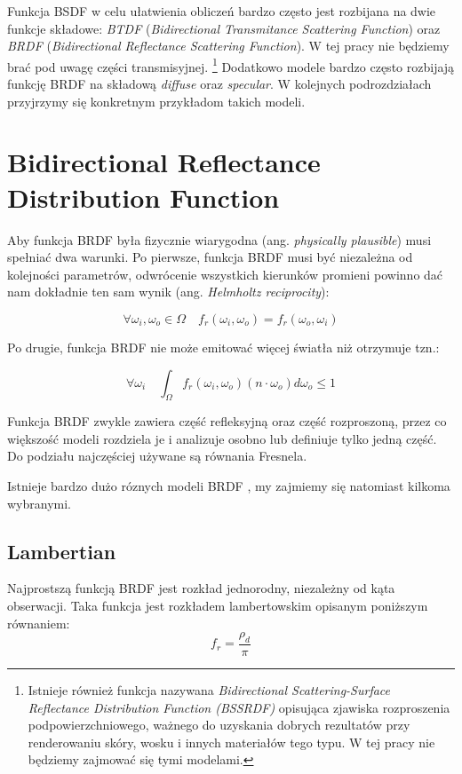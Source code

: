 \documentclass[../main.tex]{subfiles}
\begin{document}
Funkcja BSDF w celu ułatwienia obliczeń bardzo często jest rozbijana na dwie
funkcje składowe: \textit{BTDF} (\textit{Bidirectional Transmitance Scattering
Function}) oraz \textit{BRDF} (\textit{Bidirectional Reflectance Scattering
Function}). W tej pracy nie będziemy brać pod uwagę części transmisyjnej.
\footnote{
  Istnieje również funkcja nazywana \textit{Bidirectional Scattering-Surface
  Reflectance Distribution Function (BSSRDF)} opisująca zjawiska rozproszenia
  podpowierzchniowego, ważnego do uzyskania dobrych rezultatów przy
  renderowaniu skóry, wosku i innych materiałów tego typu. W tej pracy nie
  będziemy zajmować się tymi modelami.
}
Dodatkowo modele bardzo często rozbijają funkcję BRDF na składową
\textit{diffuse} oraz \textit{specular}.  W kolejnych podrozdziałach
przyjrzymy się konkretnym przykładom takich modeli.


\section{Bidirectional Reflectance Distribution Function}

Aby funkcja BRDF była fizycznie wiarygodna (ang. \textit{physically plausible})
musi spełniać dwa warunki. Po pierwsze, funkcja BRDF musi być niezależna od
kolejności parametrów, odwrócenie wszystkich kierunków promieni powinno dać nam
dokładnie ten sam wynik (ang. \textit{Helmholtz reciprocity}):

\[
  \forall{\omega_i, \omega_o \in \Omega} \quad
  f_r(\omega_i, \omega_o) = f_r(\omega_o, \omega_i)
\]

Po drugie, funkcja BRDF nie może emitować więcej światła niż otrzymuje tzn.:

\[
  \forall{\omega_i} \quad
  \int_{\Omega} {
    f_r(\omega_i, \omega_o)
    (n \cdot \omega_o)
    d\omega_o
  } \leq 1
\]

Funkcja BRDF zwykle zawiera część refleksyjną oraz część rozproszoną, przez co
większość modeli rozdziela je i analizuje osobno lub definiuje tylko jedną
część. Do podziału najczęściej używane są równania Fresnela.

Istnieje bardzo dużo róznych modeli BRDF \cite{brdf_overview}, my zajmiemy się
natomiast kilkoma wybranymi.


\subsection{Lambertian}

Najprostszą funkcją BRDF jest rozkład jednorodny, niezależny od kąta
obserwacji. Taka funkcja jest rozkładem lambertowskim opisanym poniższym
równaniem:
\[
  f_r = \frac{\rho_d}{\pi}
\]
\end{document}
